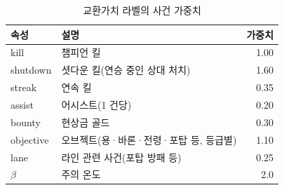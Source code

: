 \begin{table}[htbp]
  \centering
  \caption{교환가치 라벨의 사건 가중치}
  \label{tab:label-weights}
  \small
  \begin{tabular}{@{}llr@{}}
    \toprule
    속성 & 설명 & 가중치 \\
    \midrule
    kill & 챔피언 킬 & 1.00 \\
    shutdown & 셧다운 킬(연승 중인 상대 처치) & 1.60 \\
    streak & 연속 킬 & 0.35 \\
    assist & 어시스트(1 건당) & 0.20 \\
    bounty & 현상금 골드 & 0.30 \\
    objective & 오브젝트(용·바론·전령·포탑 등, 등급별) & 1.10 \\
    lane & 라인 관련 사건(포탑 방패 등) & 0.25 \\
    \midrule
    $\beta$ & 주의 온도 & 2.0 \\
    \bottomrule
  \end{tabular}
\end{table}
